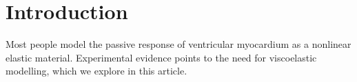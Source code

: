 \section{Introduction}
\label{introduction}

Most people model the passive response of ventricular myocardium as a
nonlinear elastic material. Experimental evidence points to the need
for viscoelastic modelling, which we explore in this article.

